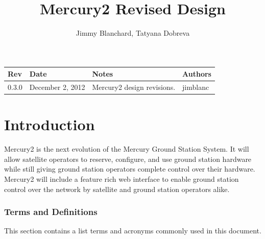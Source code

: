 \documentclass{mxl-design}
\title{Mercury2 Revised Design}
\author{Jimmy Blanchard, Tatyana Dobreva}
\begin{document}
\maketitle

\vspace{5in}
\begin{table}[H]
\begin{center}
\begin{tabular}{|p{0.5in}|p{1.2in}|p{2.8in}|p{0.5in}|}
	\hline
	\bf Rev & \bf Date & \bf Notes & \bf Authors \\ 
	\hline
	0.3.0 & December 2, 2012 & Mercury2 design revisions. & jimblanc \\ \hline
\end{tabular}
\end{center}
\end{table}

\clearpage
\tableofcontents
\clearpage

\part{Introduction}
Mercury2 is the next evolution of the Mercury Ground Station System. It will allow satellite operators to reserve, configure, and use ground station hardware while still giving ground station operators complete control over their hardware. Mercury2 will include a feature rich web interface to enable ground station control over the network by satellite and ground station operators alike.

\section{Terms and Definitions}
\label{sec:terms}
This section contains a list terms and acronyms commonly used in this document.
\end{document}
